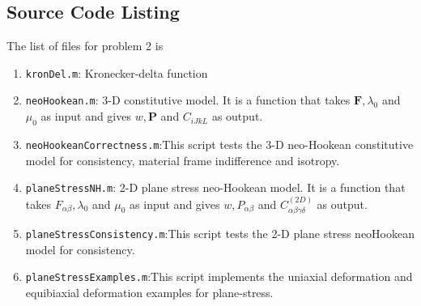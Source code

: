 \message{ !name(p1_2.tex)}\documentclass[../main.tex]{subfiles}
\begin{document}
\subsection{Source Code Listing}
The list of files for problem 2 is
\begin{enumerate}
\item \texttt{kronDel.m}: Kronecker-delta function
\item \texttt{neoHookean.m}: 3-D constitutive model. It is a function
  that takes $\mathbf{F},\lambda_0$ and $\mu_0$ as input and gives
  $w,\mathbf{P}$ and $C_{iJkL}$ as output.
\item \texttt{neoHookeanCorrectness.m}:This script tests the 3-D
  neo-Hookean constitutive model for consistency, material frame
  indifference and isotropy.
\item \texttt{planeStressNH.m}: 2-D plane stress neo-Hookean model. It
  is a function that takes $F_{\alpha\beta},\lambda_0$ and $\mu_0$ as
  input and gives $w,P_{\alpha\beta}$ and
  $C^{(2D)}_{\alpha\beta\gamma\delta}$ as output.
\item \texttt{planeStressConsistency.m}:This script tests the 2-D
  plane stress neoHookean model for consistency.
\item \texttt{planeStressExamples.m}:This script implements the
  uniaxial deformation and equibiaxial deformation examples for
  plane-stress.
\end{enumerate}
\end{document}
